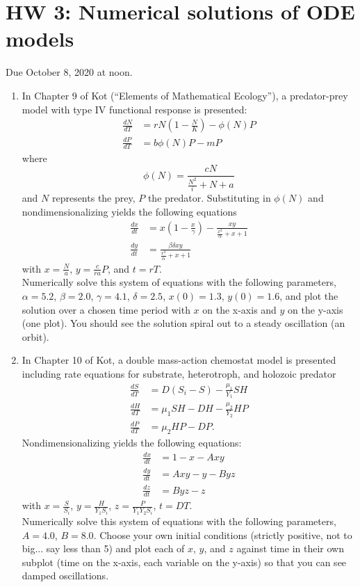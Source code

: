 \documentclass[11pt]{article}
\begin{document}
\section*{HW 3: Numerical solutions of ODE models}
Due October 8, 2020 at noon.

\begin{enumerate}
	\item In Chapter 9 of Kot (``Elements of Mathematical Ecology''), a predator-prey model with type IV functional response is presented:
	\begin{align*}
		\frac{dN}{dT} &= rN\left(1-\frac{N}{K}\right) - \phi(N)P\\
		\frac{dP}{dT} &= b\phi(N)P-mP
	\end{align*}
	where
	\[
	\phi(N) = \frac{cN}{\frac{N^2}{i}+N+a}
	\]
	and $N$ represents the prey, $P$ the predator. Substituting in $\phi(N)$ and nondimensionalizing yields the following equations
	\begin{align*}
		\frac{dx}{dt} &= x\left(1-\frac{x}{\gamma}\right) - \frac{xy}{\frac{x^2}{\alpha}+x+1}\\
		\frac{dy}{dt} &= \frac{\beta\delta xy}{\frac{x^2}{\alpha}+x+1}
	\end{align*}
	with $x=\frac{N}{a}$, $y=\frac{c}{ra}P$, and $t=rT$.\\
	Numerically solve this system of equations with the following parameters,\\
	$\alpha=5.2$, $\beta=2.0$, $\gamma=4.1$, $\delta=2.5$, $x(0)=1.3$, $y(0)=1.6$,
	and plot the solution over a chosen time period with $x$ on the x-axis and $y$ on the y-axis (one plot). You should see the solution spiral out to a steady oscillation (an orbit).
	
	\item In Chapter 10 of Kot, a double mass-action chemostat model is presented including rate equations for substrate, heterotroph, and holozoic predator
	\begin{align*}
		\frac{dS}{dT} &= D(S_i-S) - \frac{\mu_1}{Y_1}SH\\
		\frac{dH}{dT} &= \mu_1SH - DH - \frac{\mu_2}{Y_2}HP\\
		\frac{dP}{dT} &= \mu_2HP - DP.
	\end{align*}
	Nondimensionalizing yields the following equations:
	\begin{align*}
		\frac{dx}{dt} &= 1-x-Axy\\
		\frac{dy}{dt} &= Axy-y-Byz\\
		\frac{dz}{dt} &= Byz-z
	\end{align*}
	with $x=\frac{S}{S_i}$, $y=\frac{H}{Y_1S_i}$, $z=\frac{P}{Y_1Y_2S_i}$, $t=DT$.\\
	Numerically solve this system of equations with the following parameters,\\
	$A=4.0$, $B=8.0$. Choose your own initial conditions (strictly positive, not to big... say less than 5) and plot each of $x$, $y$, and $z$ against time in their own subplot (time on the x-axis, each variable on the y-axis) so that you can see damped oscillations.
\end{enumerate}
\end{document}
